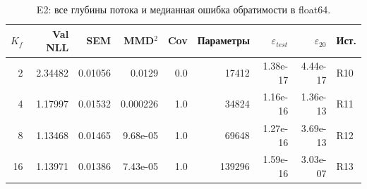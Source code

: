 \begin{table}[H]\centering\scriptsize
\setlength{\tabcolsep}{4pt}
\caption{E2: все глубины потока и медианная ошибка обратимости в float64.}\label{tab:depth}
\begin{tabular}{rrrrrrrrl}
\toprule
$K_f$ & Val NLL & SEM & MMD$^2$ & Cov & Параметры & $\varepsilon_{test}$ & $\varepsilon_{20}$ & Ист. \\
\midrule
2 & 2.34482 & 0.01056 & 0.0129 & 0.0 & 17412 & 1.38e-17 & 4.44e-17 & R10 \\
4 & 1.17997 & 0.01532 & 0.000226 & 1.0 & 34824 & 1.16e-16 & 1.36e-13 & R11 \\
8 & 1.13468 & 0.01465 & 9.68e-05 & 1.0 & 69648 & 1.27e-16 & 3.69e-13 & R12 \\
16 & 1.13971 & 0.01386 & 7.43e-05 & 1.0 & 139296 & 1.59e-16 & 3.03e-07 & R13 \\
\bottomrule
\end{tabular}
\end{table}
